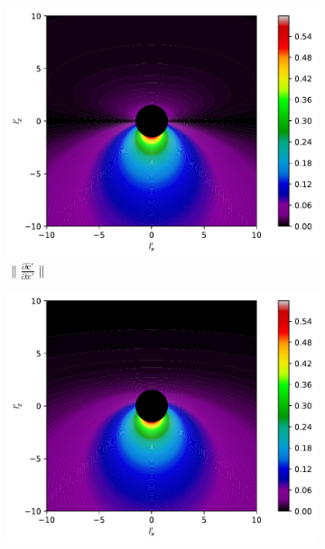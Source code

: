 \begin{figure}[H]
	\centering
	\begin{subfigure}{0.32\textwidth}
		\centering
		\includegraphics[width=\textwidth]{images/pdf/Rate_of_change_of_lights_velocity_field_with_respect_to_x.pdf}
		\caption{$\|\frac{\partial \mathbf{\hat{c}}'}{\partial x'}\|$}
		\label{fig: Rate of change of lights velocity field subfig_1}
	\end{subfigure}
	\begin{subfigure}{0.32\textwidth}
		\centering
		\includegraphics[width=\textwidth]{images/pdf/Rate_of_change_of_lights_velocity_field_with_respect_to_y.pdf}

\end{subfigure}
\end{figure}
